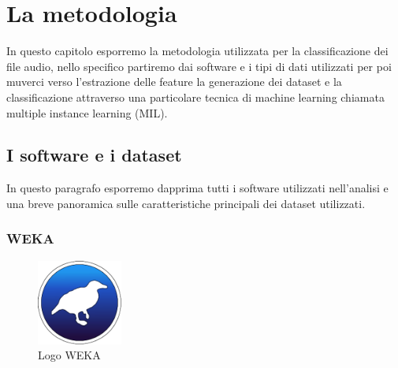 \chapter{La metodologia}
In questo capitolo esporremo la metodologia utilizzata per la classificazione dei file audio, nello specifico partiremo dai software e i tipi di dati utilizzati per poi muverci verso l'estrazione delle feature la generazione dei dataset e la classificazione attraverso una particolare tecnica di machine learning chiamata multiple instance learning (MIL). 
\section{I software e i dataset}
In questo paragrafo esporremo dapprima tutti i software utilizzati nell'analisi e una breve panoramica sulle caratteristiche principali dei dataset utilizzati.  
\subsection{WEKA}
\begin{figure}[h]
        \centering
        \includegraphics[width=0.25\textwidth]{imgs/capitolo4/weka.png}
        \caption{Logo WEKA}
        \label{fig:weka}
\end{figure}
\FloatBarrier %